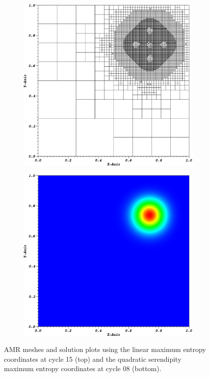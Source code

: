 \documentclass[11pt]{article}
\begin{document}
\begin{figure}[hbt]
\begin{subfigure}[b]{0.35\textwidth}
	\end{subfigure}
	\par\bigskip
	\begin{subfigure}[b]{0.35\textwidth}
		\centering
		\includegraphics[width=\textwidth]{figures/ME2_cart_mesh.eps}
	\end{subfigure}
	\hspace{1cm}
	\begin{subfigure}[b]{0.35\textwidth}
		\centering
		\includegraphics[width=\textwidth]{figures/ME2_cart_sol.eps}
	\end{subfigure}
\caption{AMR meshes and solution plots using the linear maximum entropy coordinates at cycle 15 (top) and the quadratic serendipity maximum entropy coordinates at cycle 08 (bottom).}
\label{fig::AMR_plots}
\end{figure}
\end{document}
